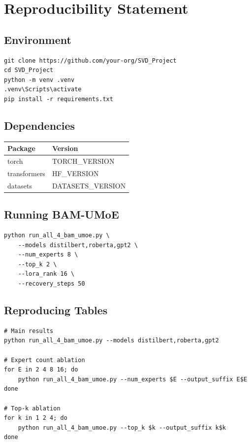 \section{Reproducibility Statement}

\subsection{Environment}

\begin{lstlisting}
git clone https://github.com/your-org/SVD_Project
cd SVD_Project
python -m venv .venv
.venv\Scripts\activate
pip install -r requirements.txt
\end{lstlisting}

\subsection{Dependencies}

\begin{table}[H]
\centering
\small
\begin{tabular}{ll}
\toprule
\textbf{Package} & \textbf{Version} \\
\midrule
torch & {{TORCH\_VERSION}} \\
transformers & {{HF\_VERSION}} \\
datasets & {{DATASETS\_VERSION}} \\
\bottomrule
\end{tabular}
\end{table}

\subsection{Running BAM-UMoE}

\begin{lstlisting}
python run_all_4_bam_umoe.py \
    --models distilbert,roberta,gpt2 \
    --num_experts 8 \
    --top_k 2 \
    --lora_rank 16 \
    --recovery_steps 50
\end{lstlisting}

\subsection{Reproducing Tables}

\begin{lstlisting}
# Main results
python run_all_4_bam_umoe.py --models distilbert,roberta,gpt2

# Expert count ablation
for E in 2 4 8 16; do
    python run_all_4_bam_umoe.py --num_experts $E --output_suffix E$E
done

# Top-k ablation
for k in 1 2 4; do
    python run_all_4_bam_umoe.py --top_k $k --output_suffix k$k
done
\end{lstlisting}


